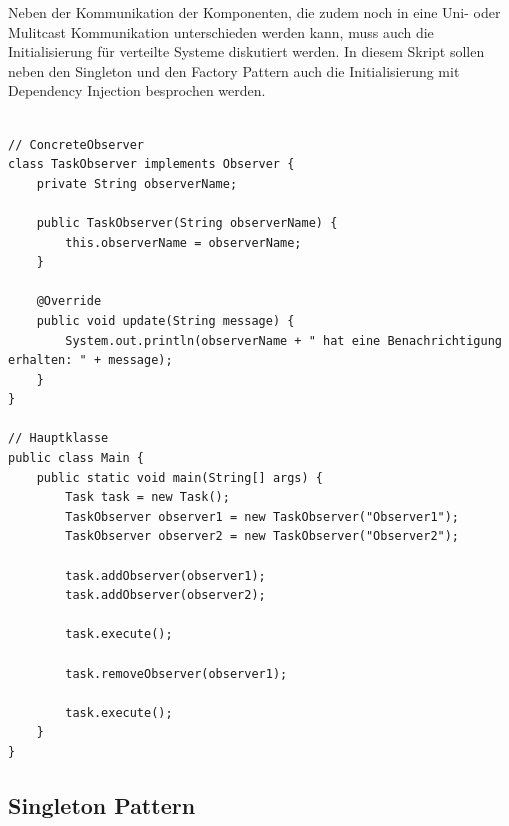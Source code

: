 \documentclass[../vs-script-first-v01.tex]{subfiles}
\begin{document}
Neben der Kommunikation der Komponenten, die zudem noch in eine Uni- oder Mulitcast Kommunikation unterschieden werden kann, muss auch die Initialisierung für verteilte Systeme diskutiert werden. In diesem Skript sollen neben den Singleton und den Factory Pattern auch die Initialisierung mit Dependency Injection besprochen werden.\\\\
\begin{minipage}{\textwidth}
\begin{lstlisting}[caption={Observer Pattern - Concrete Observer},captionpos=b,label={lst:observer-II}]
// ConcreteObserver
class TaskObserver implements Observer {
    private String observerName;

    public TaskObserver(String observerName) {
        this.observerName = observerName;
    }

    @Override
    public void update(String message) {
        System.out.println(observerName + " hat eine Benachrichtigung erhalten: " + message);
    }
}

// Hauptklasse
public class Main {
    public static void main(String[] args) {
        Task task = new Task();
        TaskObserver observer1 = new TaskObserver("Observer1");
        TaskObserver observer2 = new TaskObserver("Observer2");

        task.addObserver(observer1);
        task.addObserver(observer2);

        task.execute();

        task.removeObserver(observer1);

        task.execute();
    }
}
\end{lstlisting}
\end{minipage}

\subsection{Singleton Pattern}
\end{document}
